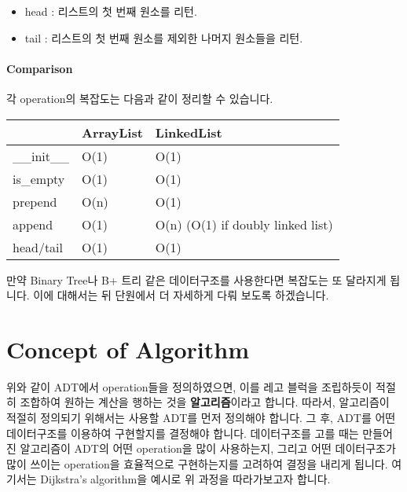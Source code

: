 \documentclass[titlepage]{report}
\begin{document}
\begin{itemize}
\item head : 리스트의 첫 번째 원소를 리턴. 

 

\item tail : 리스트의 첫 번째 원소를 제외한 나머지 원소들을 리턴. 

 
\end{itemize}

\paragraph{Comparison} 

각 operation의 복잡도는 다음과 같이 정리할 수 있습니다. 


\begin{table}[h]
\begin{tabular}{|l|l|l|}
\hline
             & ArrayList & LinkedList                        \\ \hline
\_\_init\_\_ & O(1)      & O(1)                              \\ \hline
is\_empty    & O(1)      & O(1)                              \\ \hline
prepend      & O(n)      & O(1)                              \\ \hline
append       & O(1)      & O(n) (O(1) if doubly linked list) \\ \hline
head/tail    & O(1)      & O(1)                              \\ \hline
\end{tabular}
\end{table}

만약 Binary Tree나 B+ 트리 같은 데이터구조를 사용한다면 복잡도는 또 달라지게 됩니다. 이에 대해서는 뒤 단원에서 더 자세하게 다뤄 보도록 하겠습니다. 

\section{Concept of Algorithm} 

위와 같이 ADT에서 operation들을 정의하였으면, 이를 레고 블럭을 조립하듯이 적절히 조합하여 원하는 계산을 행하는 것을 \textbf{알고리즘}이라고 합니다. 따라서, 알고리즘이 적절히 정의되기 위해서는 사용할 ADT를 먼저 정의해야 합니다. 그 후, ADT를 어떤 데이터구조를 이용하여 구현할지를 결정해야 합니다. 데이터구조를 고를 때는 만들어진 알고리즘이 ADT의 어떤 operation을 많이 사용하는지, 그리고 어떤 데이터구조가 많이 쓰이는 operation을 효율적으로 구현하는지를 고려하여 결정을 내리게 됩니다. 여기서는 Dijkstra's algorithm을 예시로 위 과정을 따라가보고자 합니다. 
\end{document}

